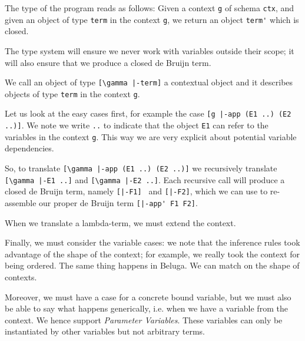 The type of the program reads as follows: Given a context
\lstinline!g! of schema \lstinline!ctx!, and given an object of type
\lstinline!term! in the context \lstinline!g!, we return an object
\lstinline!term'! which is closed.

The type system will ensure we never work with variables outside their
scope; it will also ensure that we produce a closed de Bruijn term.

We call an object of type \lstinline![\gamma |-term]! a contextual object and
it describes objects of type \lstinline!term! in the context
\lstinline!g!.

Let us look at the easy cases first, for example the case 
\lstinline![g |-app (E1 ..) (E2 ..)]!.  We note we write \lstinline!..!
to indicate that the object \lstinline!E1! can refer to the variables
in the context \lstinline!g!. This way we are very explicit about
potential variable dependencies.

So, to translate \lstinline![\gamma |-app (E1 ..) (E2 ..)]! we recursively
translate \lstinline![\gamma |-E1 ..]! and \lstinline![\gamma |-E2 ..]!. Each
recursive call will produce a closed de Bruijn term, namely
\lstinline![|-F1] ! and \lstinline![|-F2]!, which we can use to
re-assemble our proper de Bruijn term \lstinline![|-app' F1 F2]!.

When we translate a lambda-term, we must extend the context. 


Finally, we must consider the variable cases: we note that the
inference rules took advantage of the shape of the context; for
example, we really took the context for being ordered. The same thing
happens in Beluga. We can match on the shape of contexts.


Moreover, we must have a case for a concrete bound variable, but we
must also be able to say what happens generically, i.e. when we have a
variable from the context. We hence support \emph{Parameter
  Variables}. These variables can only be instantiated by other
variables but not arbitrary terms.



